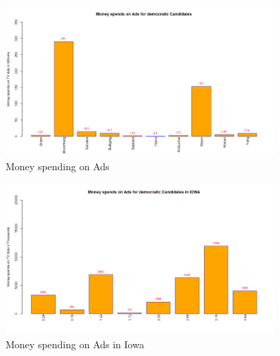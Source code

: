 \begin{figure}[H]
    \centering
    \includegraphics[width=0.9\textwidth]{figures/MoneyspendinAds.png}
    \caption{Money spending on Ads}
    \label{MoneyspendinAds}
\end{figure}
\begin{figure}[H]
    \centering
    \includegraphics[width=0.9\textwidth]{figures/IOWA.png}
    \caption{Money spending on Ads in Iowa}
    \label{IOWA}
\end{figure}

